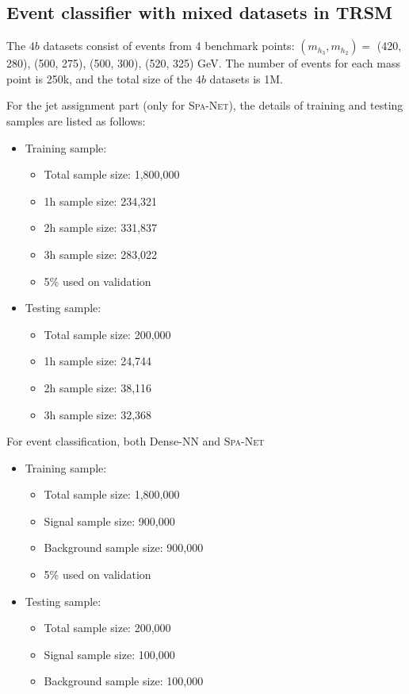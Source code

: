 \documentclass[12pt]{article}
\begin{document}
    \subsection{Event classifier with mixed datasets in TRSM}%
    \label{sub:event_classifier_with_mixed_datasets_in_trsm}
       The $4b$ datasets consist of events from 4 benchmark points: $(m_{h_3}, m_{h_2}) = $ (420, 280), (500, 275), (500, 300), (520, 325) GeV. The number of events for each mass point is 250k, and the total size of the $4b$ datasets is 1M.

        For the jet assignment part (only for \textsc{Spa-Net}), the details of training and testing samples are listed as follows:

        \begin{itemize}
            \item Training sample:
            \begin{itemize}
                \item Total sample size: 1,800,000
                \item 1h sample size: 234,321
                \item 2h sample size: 331,837
                \item 3h sample size: 283,022
                \item 5\% used on validation
            \end{itemize}
            \item Testing sample:
            \begin{itemize}
                \item Total sample size: 200,000
                \item 1h sample size: 24,744
                \item 2h sample size: 38,116
                \item 3h sample size: 32,368
            \end{itemize}
        \end{itemize}

        For event classification, both Dense-NN and \textsc{Spa-Net}
        \begin{itemize}
            \item Training sample:
            \begin{itemize}
                \item Total sample size: 1,800,000
                \item Signal sample size: 900,000
                \item Background sample size: 900,000
                \item 5\% used on validation
            \end{itemize}
            \item Testing sample:
            \begin{itemize}
                \item Total sample size: 200,000
                \item Signal sample size: 100,000
                \item Background sample size: 100,000
            \end{itemize}
        \end{itemize}
\end{document}
